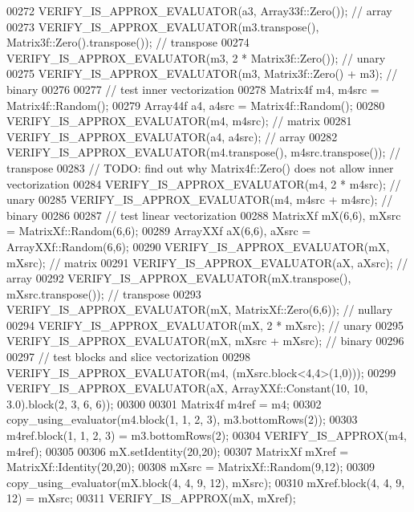 \begin{DoxyCode}
00272     VERIFY\_IS\_APPROX\_EVALUATOR(a3, Array33f::Zero());  \textcolor{comment}{// array}
00273     VERIFY\_IS\_APPROX\_EVALUATOR(m3.transpose(), Matrix3f::Zero().transpose());  \textcolor{comment}{// transpose}
00274     VERIFY\_IS\_APPROX\_EVALUATOR(m3, 2 * Matrix3f::Zero());  \textcolor{comment}{// unary}
00275     VERIFY\_IS\_APPROX\_EVALUATOR(m3, Matrix3f::Zero() + m3);  \textcolor{comment}{// binary  }
00276 
00277     \textcolor{comment}{// test inner vectorization}
00278     Matrix4f m4, m4src = Matrix4f::Random();
00279     Array44f a4, a4src = Matrix4f::Random();
00280     VERIFY\_IS\_APPROX\_EVALUATOR(m4, m4src);  \textcolor{comment}{// matrix}
00281     VERIFY\_IS\_APPROX\_EVALUATOR(a4, a4src);  \textcolor{comment}{// array}
00282     VERIFY\_IS\_APPROX\_EVALUATOR(m4.transpose(), m4src.transpose());  \textcolor{comment}{// transpose}
00283     \textcolor{comment}{// TODO: find out why Matrix4f::Zero() does not allow inner vectorization}
00284     VERIFY\_IS\_APPROX\_EVALUATOR(m4, 2 * m4src);  \textcolor{comment}{// unary}
00285     VERIFY\_IS\_APPROX\_EVALUATOR(m4, m4src + m4src);  \textcolor{comment}{// binary}
00286 
00287     \textcolor{comment}{// test linear vectorization}
00288     MatrixXf mX(6,6), mXsrc = MatrixXf::Random(6,6);
00289     ArrayXXf aX(6,6), aXsrc = ArrayXXf::Random(6,6);
00290     VERIFY\_IS\_APPROX\_EVALUATOR(mX, mXsrc);  \textcolor{comment}{// matrix}
00291     VERIFY\_IS\_APPROX\_EVALUATOR(aX, aXsrc);  \textcolor{comment}{// array}
00292     VERIFY\_IS\_APPROX\_EVALUATOR(mX.transpose(), mXsrc.transpose());  \textcolor{comment}{// transpose}
00293     VERIFY\_IS\_APPROX\_EVALUATOR(mX, MatrixXf::Zero(6,6));  \textcolor{comment}{// nullary}
00294     VERIFY\_IS\_APPROX\_EVALUATOR(mX, 2 * mXsrc);  \textcolor{comment}{// unary}
00295     VERIFY\_IS\_APPROX\_EVALUATOR(mX, mXsrc + mXsrc);  \textcolor{comment}{// binary}
00296 
00297     \textcolor{comment}{// test blocks and slice vectorization}
00298     VERIFY\_IS\_APPROX\_EVALUATOR(m4, (mXsrc.block<4,4>(1,0)));
00299     VERIFY\_IS\_APPROX\_EVALUATOR(aX, ArrayXXf::Constant(10, 10, 3.0).block(2, 3, 6, 6));
00300 
00301     Matrix4f m4ref = m4;
00302     copy\_using\_evaluator(m4.block(1, 1, 2, 3), m3.bottomRows(2));
00303     m4ref.block(1, 1, 2, 3) = m3.bottomRows(2);
00304     VERIFY\_IS\_APPROX(m4, m4ref);
00305 
00306     mX.setIdentity(20,20);
00307     MatrixXf mXref = MatrixXf::Identity(20,20);
00308     mXsrc = MatrixXf::Random(9,12);
00309     copy\_using\_evaluator(mX.block(4, 4, 9, 12), mXsrc);
00310     mXref.block(4, 4, 9, 12) = mXsrc;
00311     VERIFY\_IS\_APPROX(mX, mXref);

\end{DoxyCode}
